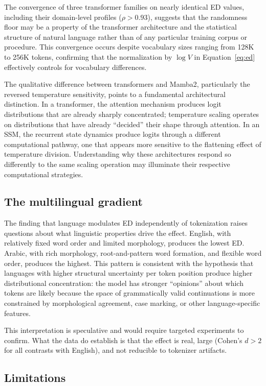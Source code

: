 \documentclass{article}
\begin{document}
The convergence of three transformer families on nearly identical ED values, including their domain-level profiles ($\rho > 0.93$), suggests that the randomness floor may be a property of the transformer architecture and the statistical structure of natural language rather than of any particular training corpus or procedure. This convergence occurs despite vocabulary sizes ranging from 128K to 256K tokens, confirming that the normalization by $\log V$ in Equation~\ref{eq:ed} effectively controls for vocabulary differences.

The qualitative difference between transformers and Mamba2, particularly the reversed temperature sensitivity, points to a fundamental architectural distinction. In a transformer, the attention mechanism produces logit distributions that are already sharply concentrated; temperature scaling operates on distributions that have already ``decided'' their shape through attention. In an SSM, the recurrent state dynamics produce logits through a different computational pathway, one that appears more sensitive to the flattening effect of temperature division. Understanding why these architectures respond so differently to the same scaling operation may illuminate their respective computational strategies.

\subsection{The multilingual gradient}

The finding that language modulates ED independently of tokenization raises questions about what linguistic properties drive the effect. English, with relatively fixed word order and limited morphology, produces the lowest ED. Arabic, with rich morphology, root-and-pattern word formation, and flexible word order, produces the highest. This pattern is consistent with the hypothesis that languages with higher structural uncertainty per token position produce higher distributional concentration: the model has stronger ``opinions'' about which tokens are likely because the space of grammatically valid continuations is more constrained by morphological agreement, case marking, or other language-specific features.

This interpretation is speculative and would require targeted experiments to confirm. What the data do establish is that the effect is real, large (Cohen's $d > 2$ for all contrasts with English), and not reducible to tokenizer artifacts.

\subsection{Limitations}
\end{document}
